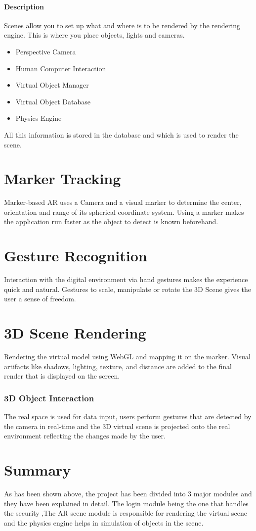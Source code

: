 \documentclass[BTech]{srmuthesis}
\begin{document}
\paragraph{Description}
Scenes allow you to set up what and where is to be rendered by the rendering engine. This is where you place objects, lights and cameras.
\begin{itemize}
\item Perspective Camera
\item Human Computer Interaction
\item Virtual Object Manager
\item Virtual Object Database
\item Physics Engine
\end{itemize}
All this information is stored in the database and which is used to render the scene. 
\section{Marker Tracking}
Marker-based AR uses a Camera and a visual marker to determine the center, orientation and range of its spherical coordinate system. Using a marker makes the application run faster as the object to detect is known beforehand.
\section{Gesture Recognition}
Interaction with the digital environment via hand gestures makes the experience quick and natural. Gestures to scale, manipulate or rotate the 3D Scene gives the user a sense of freedom.
\section{3D Scene Rendering}
Rendering the virtual model using WebGL and mapping it on the marker. Visual artifacts like shadows, lighting, texture, and distance are added to the final render that is displayed on the screen.
\subsubsection{3D Object Interaction}
The real space is used for data input, users perform gestures that are detected by the camera in real-time and the 3D virtual scene is projected onto the real environment reflecting the changes made by the user.
\section{Summary}
As has been shown above, the project has been divided into 3 major modules and they have been explained in detail. The login module being the one that handles the security ,The AR scene module is responsible for rendering the virtual scene and the physics engine helps in simulation of objects in the scene.
\end{document}
